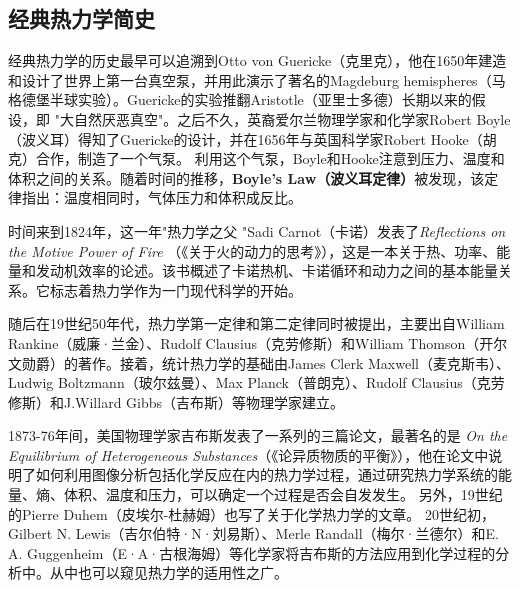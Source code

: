 \subsection{经典热力学简史}

\qquad 经典热力学的历史最早可以追溯到Otto von Guericke（克里克），他在1650年建造和设计了世界上第一台真空泵，并用此演示了著名的Magdeburg hemispheres（马格德堡半球实验）。Guericke的实验推翻Aristotle（亚里士多德）长期以来的假设，即 "大自然厌恶真空"。之后不久，英裔爱尔兰物理学家和化学家Robert Boyle（波义耳）得知了Guericke的设计，并在1656年与英国科学家Robert Hooke（胡克）合作，制造了一个气泵。\cite{partington1989short} 利用这个气泵，Boyle和Hooke注意到压力、温度和体积之间的关系。随着时间的推移，\textbf{Boyle's Law（波义耳定律）}被发现，该定律指出：温度相同时，气体压力和体积成反比。

时间来到1824年，这一年"热力学之父 "Sadi Carnot（卡诺）发表了\textit{Reflections on the Motive Power of Fire} （《关于火的动力的思考》），这是一本关于热、功率、能量和发动机效率的论述。该书概述了卡诺热机、卡诺循环和动力之间的基本能量关系。它标志着热力学作为一门现代科学的开始。\cite{perrot1998z}

随后在19世纪50年代，热力学第一定律和第二定律同时被提出，主要出自William Rankine（威廉·兰金）、Rudolf Clausius（克劳修斯）和William Thomson（开尔文勋爵）的著作。接着，统计热力学的基础由James Clerk Maxwell（麦克斯韦）、Ludwig Boltzmann（玻尔兹曼）、Max Planck（普朗克）、Rudolf Clausius（克劳修斯）和J.Willard Gibbs（吉布斯）等物理学家建立。

1873-76年间，美国物理学家吉布斯发表了一系列的三篇论文，最著名的是\textit{ On the Equilibrium of Heterogeneous Substances}（《论异质物质的平衡》）\cite{connecticut1866transactions}，他在论文中说明了如何利用图像分析包括化学反应在内的热力学过程，通过研究热力学系统的能量、熵、体积、温度和压力，可以确定一个过程是否会自发发生。\cite{sugi1993scientific} 另外，19世纪的Pierre Duhem（皮埃尔-杜赫姆）也写了关于化学热力学的文章\cite{duhem1886potentiel}。 20世纪初，Gilbert N. Lewis（吉尔伯特·N·刘易斯）、Merle Randall（梅尔·兰德尔）\cite{lewis1923thermodynamics}和E. A. Guggenheim（E·A·古根海姆）\cite{guggenheim2002modern,guggenheim1967advanced}等化学家将吉布斯的方法应用到化学过程的分析中。从中也可以窥见热力学的适用性之广。

